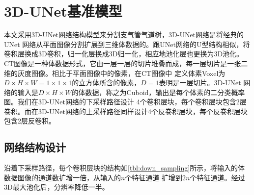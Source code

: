 \section{3D-UNet基准模型}
本文采用3D-UNet\cite{cciccek20163d}网络结构模型来分割支气管气道树，3D-UNet网络是将经典的UNet\cite{ronneberger2015u}
网络从平面图像分割扩展到三维体数据的。跟UNet网络的U型结构相似，将卷积层换成3D卷积，归一化层换成3D归一化，相应地池化层也更换为3D池化。
CT图像是一种体数据形式，它由一层一层的切片堆叠而成，每一层切片是一张二维的灰度图像。相比于平面图像中的像素，在CT图像中
定义体素Voxel为$D \times H \times W = 1 \times 1 \times 1$的立方体所含的像素，$D = 1$表明是一层切片。3D-UNet
网络的输入是$D \times H \times W$的体数据，称之为Cuboid，输出是每个体素的二分类概率图。我们在3D-UNet网络的下采样路径设计
4个卷积层块，每个卷积层块包含2层卷积。而在3D-UNet网络的上采样路径同样设计4个反卷积层块，每个反卷积层块包含2层反卷积。

\subsection{网络结构设计}

沿着下采样路径，每个卷积层块的结构如\autoref{tbl:down_sampling}所示，将输入的体数据图像的通道数扩增一倍，从输入的$n$个特征通道
扩增到$2n$个特征通道。经过3D最大池化后，分辨率降低一半。


